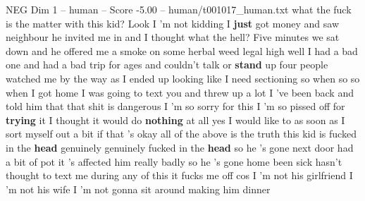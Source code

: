 \begin{textsample}{NEG Dim 1 – human – Score -5.00 – human/t001017\_human.txt}  \label{ex:f1_neg_036}
what the fuck is the matter with this kid?
Look I 'm not kidding I \textbf{just} got money and saw neighbour he invited me in and I thought what the hell?
Five minutes we sat down and he offered me a smoke on some herbal weed legal high well I had a bad one and had a bad trip for ages and couldn't talk or \textbf{stand} up four people watched me by the way as I ended up looking like I need sectioning so when so so when I got home I was going to text you and threw up a lot I 've been back and told him that that shit is dangerous I 'm so sorry for this I 'm so pissed off for \textbf{trying} it I thought it would do \textbf{nothing} at all yes I would like to as soon as I sort myself out a bit if that 's okay all of the above is the truth this kid is fucked in the \textbf{head} genuinely genuinely fucked in the \textbf{head} so he 's gone next door had a bit of pot it 's affected him really badly so he 's gone home been sick hasn't thought to text me during any of this it fucks me off cos I 'm not his girlfriend I 'm not his wife I 'm not gonna sit around making him dinner

\end{textsample}
